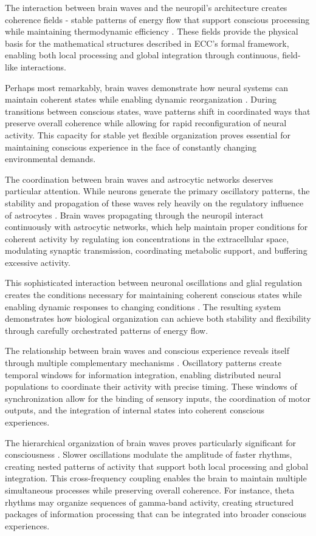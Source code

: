 The interaction between brain waves and the neuropil's architecture creates coherence fields - stable patterns of energy flow that support conscious processing while maintaining thermodynamic efficiency \cite{Fries2015}. These fields provide the physical basis for the mathematical structures described in ECC's formal framework, enabling both local processing and global integration through continuous, field-like interactions.

Perhaps most remarkably, brain waves demonstrate how neural systems can maintain coherent states while enabling dynamic reorganization \cite{Engel2001}. During transitions between conscious states, wave patterns shift in coordinated ways that preserve overall coherence while allowing for rapid reconfiguration of neural activity. This capacity for stable yet flexible organization proves essential for maintaining conscious experience in the face of constantly changing environmental demands.

The coordination between brain waves and astrocytic networks deserves particular attention. While neurons generate the primary oscillatory patterns, the stability and propagation of these waves rely heavily on the regulatory influence of astrocytes \cite{Ward2003}. Brain waves propagating through the neuropil interact continuously with astrocytic networks, which help maintain proper conditions for coherent activity by regulating ion concentrations in the extracellular space, modulating synaptic transmission, coordinating metabolic support, and buffering excessive activity.

This sophisticated interaction between neuronal oscillations and glial regulation creates the conditions necessary for maintaining coherent conscious states while enabling dynamic responses to changing conditions \cite{Basar2013}. The resulting system demonstrates how biological organization can achieve both stability and flexibility through carefully orchestrated patterns of energy flow.

The relationship between brain waves and conscious experience reveals itself through multiple complementary mechanisms \cite{Jensen2007}. Oscillatory patterns create temporal windows for information integration, enabling distributed neural populations to coordinate their activity with precise timing. These windows of synchronization allow for the binding of sensory inputs, the coordination of motor outputs, and the integration of internal states into coherent conscious experiences.

The hierarchical organization of brain waves proves particularly significant for consciousness \cite{Lisman2013}. Slower oscillations modulate the amplitude of faster rhythms, creating nested patterns of activity that support both local processing and global integration. This cross-frequency coupling enables the brain to maintain multiple simultaneous processes while preserving overall coherence. For instance, theta rhythms may organize sequences of gamma-band activity, creating structured packages of information processing that can be integrated into broader conscious experiences.

